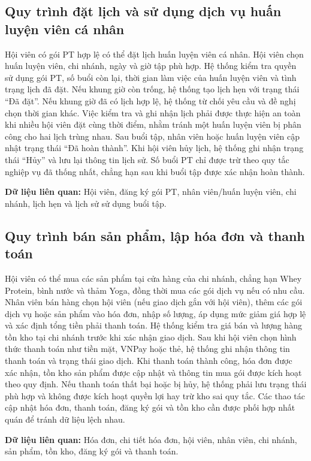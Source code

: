\documentclass[11pt, a4paper]{article}
\begin{document}
\subsection{Quy trình đặt lịch và sử dụng dịch vụ huấn luyện viên cá nhân}
Hội viên có gói PT hợp lệ có thể đặt lịch huấn luyện viên cá nhân. Hội viên chọn huấn luyện viên, chi nhánh, ngày và giờ tập phù hợp. Hệ thống kiểm tra quyền sử dụng gói PT, số buổi còn lại, thời gian làm việc của huấn luyện viên và tình trạng lịch đã đặt. Nếu khung giờ còn trống, hệ thống tạo lịch hẹn với trạng thái “Đã đặt”. Nếu khung giờ đã có lịch hợp lệ, hệ thống từ chối yêu cầu và đề nghị chọn thời gian khác. Việc kiểm tra và ghi nhận lịch phải được thực hiện an toàn khi nhiều hội viên đặt cùng thời điểm, nhằm tránh một huấn luyện viên bị phân công cho hai lịch trùng nhau. Sau buổi tập, nhân viên hoặc huấn luyện viên cập nhật trạng thái “Đã hoàn thành”. Khi hội viên hủy lịch, hệ thống ghi nhận trạng thái “Hủy” và lưu lại thông tin lịch sử. Số buổi PT chỉ được trừ theo quy tắc nghiệp vụ đã thống nhất, chẳng hạn sau khi buổi tập được xác nhận hoàn thành.

\textbf{Dữ liệu liên quan:} Hội viên, đăng ký gói PT, nhân viên/huấn luyện viên, chi nhánh, lịch hẹn và lịch sử sử dụng buổi tập.

\subsection{Quy trình bán sản phẩm, lập hóa đơn và thanh toán}
Hội viên có thể mua các sản phẩm tại cửa hàng của chi nhánh, chẳng hạn Whey Protein, bình nước và thảm Yoga, đồng thời mua các gói dịch vụ nếu có nhu cầu. Nhân viên bán hàng chọn hội viên (nếu giao dịch gắn với hội viên), thêm các gói dịch vụ hoặc sản phẩm vào hóa đơn, nhập số lượng, áp dụng mức giảm giá hợp lệ và xác định tổng tiền phải thanh toán. Hệ thống kiểm tra giá bán và lượng hàng tồn kho tại chi nhánh trước khi xác nhận giao dịch. Sau khi hội viên chọn hình thức thanh toán như tiền mặt, VNPay hoặc thẻ, hệ thống ghi nhận thông tin thanh toán và trạng thái giao dịch. Khi thanh toán thành công, hóa đơn được xác nhận, tồn kho sản phẩm được cập nhật và thông tin mua gói được kích hoạt theo quy định. Nếu thanh toán thất bại hoặc bị hủy, hệ thống phải lưu trạng thái phù hợp và không được kích hoạt quyền lợi hay trừ kho sai quy tắc. Các thao tác cập nhật hóa đơn, thanh toán, đăng ký gói và tồn kho cần được phối hợp nhất quán để tránh dữ liệu lệch nhau.

\textbf{Dữ liệu liên quan:} Hóa đơn, chi tiết hóa đơn, hội viên, nhân viên, chi nhánh, sản phẩm, tồn kho, đăng ký gói và thanh toán.
\end{document}
